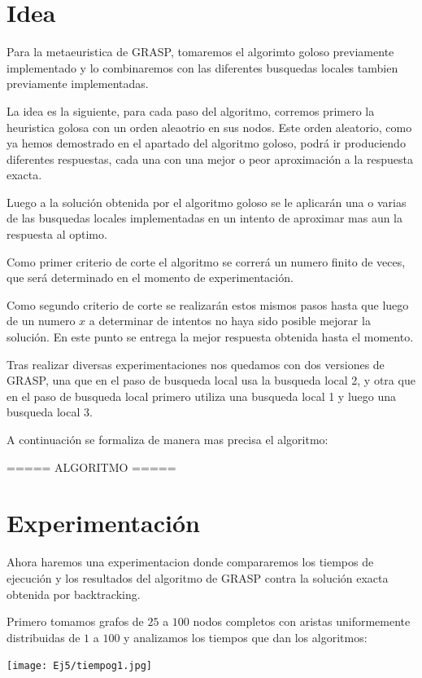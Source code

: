 \section{Idea}

Para la metaeuristica de GRASP, tomaremos el algorimto goloso previamente implementado y lo combinaremos con las diferentes busquedas locales tambien previamente implementadas.

La idea es la siguiente, para cada paso del algoritmo, corremos primero la heuristica golosa con un orden aleaotrio en sus nodos. Este orden aleatorio, como ya hemos demostrado en el apartado del algoritmo goloso, podrá ir produciendo diferentes respuestas, cada una con una mejor o peor aproximación a la respuesta exacta.

Luego a la solución obtenida por el algoritmo goloso se le aplicarán una o varias de las busquedas locales implementadas en un intento de aproximar mas aun la respuesta al optimo.

Como primer criterio de corte el algoritmo se correrá un numero finito de veces, que será determinado en el momento de experimentación.

Como segundo criterio de corte se realizarán estos mismos pasos hasta que luego de un numero $x$ a determinar de intentos no haya sido posible mejorar la solución. En este punto se entrega la mejor respuesta obtenida hasta el momento.

Tras realizar diversas experimentaciones nos quedamos con dos versiones de GRASP, una que en el paso de busqueda local usa la busqueda local 2, y otra que en el paso de busqueda local primero utiliza una busqueda local 1 y luego una busqueda local 3.

A continuación se formaliza de manera mas precisa el algoritmo:


===== ALGORITMO =====


\section{Experimentación}

Ahora haremos una experimentacion donde compararemos los tiempos de ejecución y los resultados del algoritmo de GRASP contra la solución exacta obtenida por backtracking.

Primero tomamos grafos de $25$ a $100$ nodos completos con aristas uniformemente distribuidas de $1$ a $100$ y analizamos los tiempos que dan los algoritmos:

\texttt{[image: Ej5/tiempog1.jpg]}

